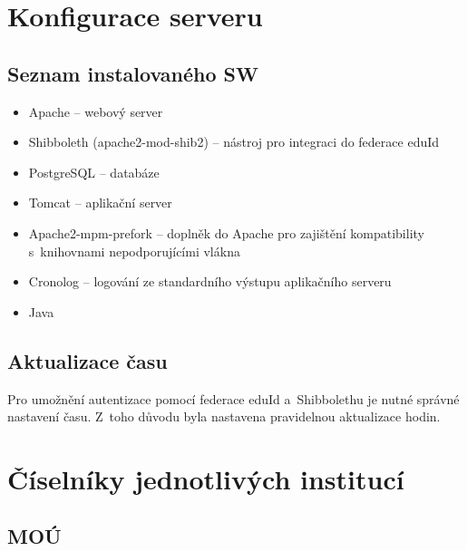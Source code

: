 \documentclass[11pt, final, oneside]{fithesis2}
\begin{document}
\begin{appendix}
\chapter{Konfigurace serveru}\label{appendix:server}

\section{Seznam instalovaného SW}
\begin{itemize}
	\item Apache -- webový server
	\item Shibboleth (apache2-mod-shib2) -- nástroj pro integraci do federace eduId
	\item PostgreSQL -- databáze
	\item Tomcat -- aplikační server
	\item Apache2-mpm-prefork -- doplněk do Apache pro zajištění kompatibility s~knihovnami nepodporujícími vlákna
	\item Cronolog -- logování ze standardního výstupu aplikačního serveru
	\item Java 
	
\end{itemize}

\section{Aktualizace času}
Pro umožnění autentizace pomocí federace eduId a~Shibbolethu je nutné správné nastavení času. Z~toho důvodu byla nastavena pravidelnou aktualizace hodin. 


\chapter{Číselníky jednotlivých institucí}

\section{MOÚ}


\end{appendix}
\end{document}
